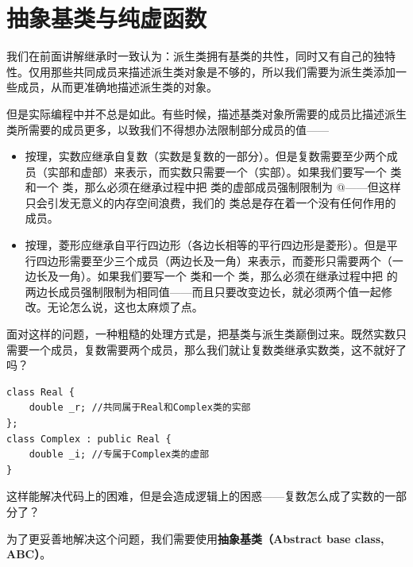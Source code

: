 \section{抽象基类与纯虚函数}
我们在前面讲解继承时一致认为：派生类拥有基类的共性，同时又有自己的独特性。仅用那些共同成员来描述派生类对象是不够的，所以我们需要为派生类添加一些成员，从而更准确地描述派生类的对象。\par
但是实际编程中并不总是如此。有些时候，描述基类对象所需要的成员比描述派生类所需要的成员更多，以致我们不得想办法限制部分成员的值——
\begin{itemize}
    \item 按理，实数应继承自复数（实数是复数的一部分）。但是复数需要至少两个成员（实部和虚部）来表示，而实数只需要一个（实部）。如果我们要写一个 \lstinline@Complex@ 类和一个 \lstinline@Real@ 类，那么必须在继承过程中把 \lstinline@Complex@ 类的虚部成员强制限制为 @——但这样只会引发无意义的内存空间浪费，我们的 \lstinline@Real@ 类总是存在着一个没有任何作用的成员。
    \item 按理，菱形应继承自平行四边形（各边长相等的平行四边形是菱形）。但是平行四边形需要至少三个成员（两边长及一角）来表示，而菱形只需要两个（一边长及一角）。如果我们要写一个 \lstinline@Parallelogram@ 类和一个 \lstinline@Rhombus@ 类，那么必须在继承过程中把 \lstinline@Parallelogram@ 的两边长成员强制限制为相同值——而且只要改变边长，就必须两个值一起修改。无论怎么说，这也太麻烦了点。
\end{itemize}
面对这样的问题，一种粗糙的处理方式是，把基类与派生类巅倒过来。既然实数只需要一个成员，复数需要两个成员，那么我们就让复数类继承实数类，这不就好了吗？
\begin{lstlisting}
class Real {
    double _r; //共同属于Real和Complex类的实部
};
class Complex : public Real {
    double _i; //专属于Complex类的虚部
}
\end{lstlisting}
这样能解决代码上的困难，但是会造成逻辑上的困惑——复数怎么成了实数的一部分了？\par
为了更妥善地解决这个问题，我们需要使用\textbf{抽象基类（Abstract base class, ABC）}。
